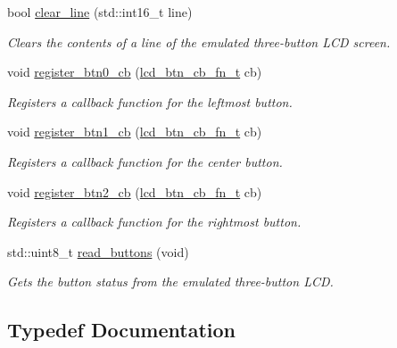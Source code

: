 \begin{DoxyCompactItemize}
bool \mbox{\hyperlink{namespacepros_1_1lcd_aef44947cea9006f86d4aaa2e32856835}{clear\+\_\+line}} (std\+::int16\+\_\+t line)
\begin{DoxyCompactList}\small\item\em Clears the contents of a line of the emulated three-\/button L\+CD screen. \end{DoxyCompactList}\item 
void \mbox{\hyperlink{namespacepros_1_1lcd_a4d8f5121ac67ae7de816334e7b66f08d}{register\+\_\+btn0\+\_\+cb}} (\mbox{\hyperlink{namespacepros_1_1lcd_ab5c0cdcf37795ff2a9dcaf546b087dd4}{lcd\+\_\+btn\+\_\+cb\+\_\+fn\+\_\+t}} cb)
\begin{DoxyCompactList}\small\item\em Registers a callback function for the leftmost button. \end{DoxyCompactList}\item 
void \mbox{\hyperlink{namespacepros_1_1lcd_a9a3a9342268b8a95d91190ab36574a0a}{register\+\_\+btn1\+\_\+cb}} (\mbox{\hyperlink{namespacepros_1_1lcd_ab5c0cdcf37795ff2a9dcaf546b087dd4}{lcd\+\_\+btn\+\_\+cb\+\_\+fn\+\_\+t}} cb)
\begin{DoxyCompactList}\small\item\em Registers a callback function for the center button. \end{DoxyCompactList}\item 
void \mbox{\hyperlink{namespacepros_1_1lcd_a5b08f4244e366a738668a5c3f700e4be}{register\+\_\+btn2\+\_\+cb}} (\mbox{\hyperlink{namespacepros_1_1lcd_ab5c0cdcf37795ff2a9dcaf546b087dd4}{lcd\+\_\+btn\+\_\+cb\+\_\+fn\+\_\+t}} cb)
\begin{DoxyCompactList}\small\item\em Registers a callback function for the rightmost button. \end{DoxyCompactList}\item 
std\+::uint8\+\_\+t \mbox{\hyperlink{namespacepros_1_1lcd_aa6ba655373f3eb0d9ef702337e89f624}{read\+\_\+buttons}} (void)
\begin{DoxyCompactList}\small\item\em Gets the button status from the emulated three-\/button L\+CD. \end{DoxyCompactList}\end{DoxyCompactItemize}


\subsection{Typedef Documentation}
\mbox{\label{namespacepros_1_1lcd_ab5c0cdcf37795ff2a9dcaf546b087dd4}} 
